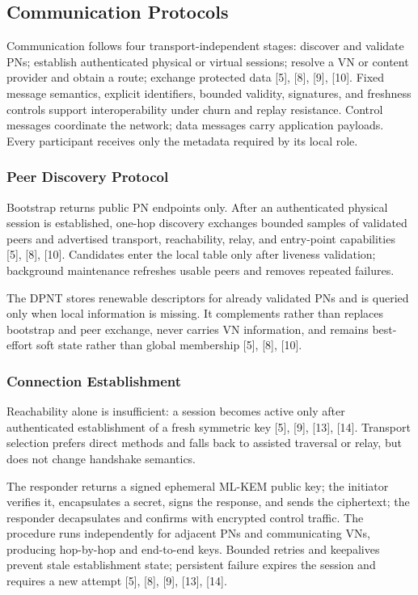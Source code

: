 \documentclass[12pt]{article}
\begin{document}
\subsection{Communication Protocols}

Communication follows four transport-independent stages: discover and validate PNs; establish authenticated physical or virtual sessions; resolve a VN or content provider and obtain a route; exchange protected data [5], [8], [9], [10]. Fixed message semantics, explicit identifiers, bounded validity, signatures, and freshness controls support interoperability under churn and replay resistance. Control messages coordinate the network; data messages carry application payloads. Every participant receives only the metadata required by its local role.

\subsubsection{Peer Discovery Protocol}

Bootstrap returns public PN endpoints only. After an authenticated physical session is established, one-hop discovery exchanges bounded samples of validated peers and advertised transport, reachability, relay, and entry-point capabilities [5], [8], [10]. Candidates enter the local table only after liveness validation; background maintenance refreshes usable peers and removes repeated failures.

The DPNT stores renewable descriptors for already validated PNs and is queried only when local information is missing. It complements rather than replaces bootstrap and peer exchange, never carries VN information, and remains best-effort soft state rather than global membership [5], [8], [10].


\subsubsection{Connection Establishment}

Reachability alone is insufficient: a session becomes active only after authenticated establishment of a fresh symmetric key [5], [9], [13], [14]. Transport selection prefers direct methods and falls back to assisted traversal or relay, but does not change handshake semantics.

The responder returns a signed ephemeral ML-KEM public key; the initiator verifies it, encapsulates a secret, signs the response, and sends the ciphertext; the responder decapsulates and confirms with encrypted control traffic. The procedure runs independently for adjacent PNs and communicating VNs, producing hop-by-hop and end-to-end keys. Bounded retries and keepalives prevent stale establishment state; persistent failure expires the session and requires a new attempt [5], [8], [9], [13], [14].
\end{document}

